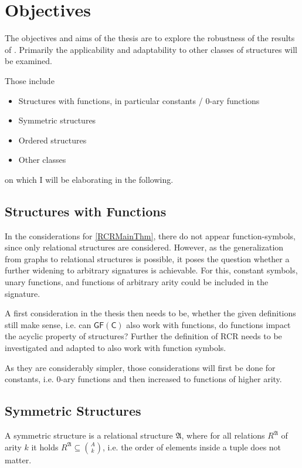 \documentclass[a4paper,11pt,DIV=15]{scrartcl} %
\theoremstyle{plain}
\theoremstyle{definition}
\begin{document}
\section{Objectives}
\label{Sec::Objectives}

The objectives and aims of the thesis are to explore the robustness of the results of \cite{scheidt2024color}. Primarily the applicability and adaptability to other classes of structures will be examined.

Those include
\begin{itemize}
	\item Structures with functions, in particular constants / $0$-ary functions
	\item Symmetric structures
	\item Ordered structures
	\item Other classes
\end{itemize}
on which I will be elaborating in the following.

\subsection{Structures with Functions}

In the considerations for \cref{RCRMainThm}, there do not appear function-symbols, since only relational structures are considered.
However, as the generalization from graphs to relational structures is possible, it poses the question whether a further widening to arbitrary signatures is achievable.
For this, constant symbols, unary functions, and functions of arbitrary arity could be included in the signature.

A first consideration in the thesis then needs to be, whether the given definitions still make sense, i.e. can $\mathsf{GF(C)}$ also work with functions, do functions impact the acyclic property of structures?
Further the definition of RCR needs to be investigated and adapted to also work with function symbols.

As they are considerably simpler, those considerations will first be done for constants, i.e. $0$-ary functions and then increased to functions of higher arity.
\label{StructWFunc}

\subsection{Symmetric Structures}

A symmetric structure is a relational structure $\mathfrak A$, where for all relations $R^\mathfrak A$ of arity $k$ it holds $R^\mathfrak A \subseteq \binom{A}{k}$, i.e. the order of elements inside a tuple does not matter.
\end{document}
